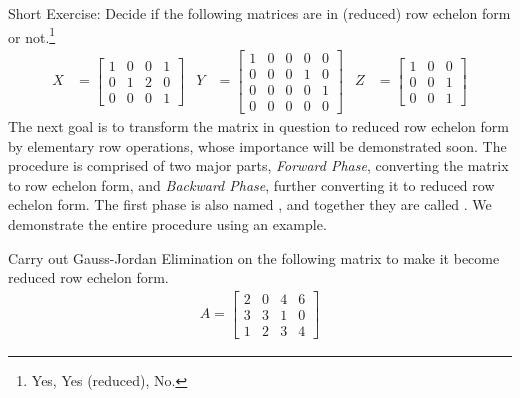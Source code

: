 Short Exercise: Decide if the following matrices are in (reduced) row echelon form or not.\footnote{Yes, Yes (reduced), No.}
\begin{align*}
X &= 
\begin{bmatrix}
1 & 0 & 0 & 1 \\
0 & 1 & 2 & 0 \\
0 & 0 & 0 & 1
\end{bmatrix}
& Y&=
\begin{bmatrix}
1 & 0 & 0 & 0 & 0 \\
0 & 0 & 0 & 1 & 0 \\
0 & 0 & 0 & 0 & 1 \\
0 & 0 & 0 & 0 & 0
\end{bmatrix}
& Z&=
\begin{bmatrix}
1 & 0 & 0 \\
0 & 0 & 1 \\
0 & 0 & 1 
\end{bmatrix}
\end{align*}
The next goal is to transform the matrix in question to reduced row echelon form by elementary row operations, whose importance will be demonstrated soon. The procedure is comprised of two major parts, \textit{Forward Phase}, converting the matrix to row echelon form, and \textit{Backward Phase}, further converting it to reduced row echelon form. The first phase is also named , and together they are called . We demonstrate the entire procedure using an example.
\begin{exmp}
Carry out Gauss-Jordan Elimination on the following matrix to make it become reduced row echelon form.
\begin{align*}
A =
\begin{bmatrix}
2 & 0 & 4 & 6 \\
3 & 3 & 1 & 0 \\
1 & 2 & 3 & 4
\end{bmatrix}    
\end{align*}
\end{exmp}

